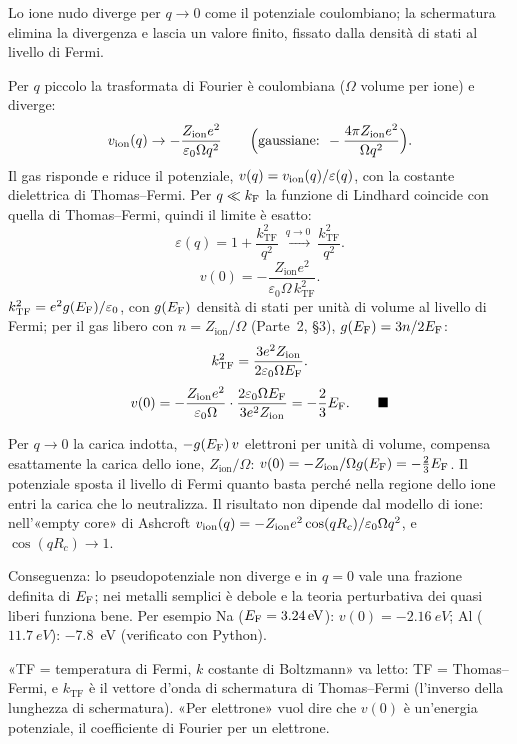 \documentclass[11pt,a4paper]{article}
\begin{document}
Lo ione nudo diverge per $q\to0$ come il potenziale coulombiano; la schermatura elimina la divergenza e lascia un valore finito, fissato dalla densità
di stati al livello di Fermi.
\begin{dimostrazione}[$v(0)=-\frac23\EF$]
Per $q$ piccolo la trasformata di Fourier è coulombiana ($\Omega$ volume per ione) e diverge:
\[
v_{\mathrm{ion}}(q)\to-\frac{Z_{\mathrm{ion}}e^2}{\varepsilon_0\Omega q^2}\qquad\Bigl(\text{gaussiane: }-\frac{4\pi Z_{\mathrm{ion}}e^2}{\Omega q^2}\Bigr).
\]
Il gas risponde e riduce il potenziale, $v(q)=v_{\mathrm{ion}}(q)/\varepsilon(q)$, con la costante dielettrica di Thomas--Fermi. Per $q\ll k_{\mathrm F}$ la funzione di
Lindhard coincide con quella di Thomas--Fermi, quindi il limite è esatto:
\[
\varepsilon(q)=1+\frac{k_{\mathrm{TF}}^2}{q^2}\ \xrightarrow{q\to0}\ \frac{k_{\mathrm{TF}}^2}{q^2}.
\]
\[
v(0)=-\frac{Z_{\mathrm{ion}}e^2}{\varepsilon_0\Omega\,k_{\mathrm{TF}}^2}.
\]
$k_{\mathrm{TF}}^2=e^2g(E_{\mathrm F})/\varepsilon_0$, con $g(E_{\mathrm F})$ densità di stati per unità di volume al livello di Fermi; per il gas libero con
$n=Z_{\mathrm{ion}}/\Omega$ (Parte~2, §3), $g(E_{\mathrm F})=3n/2E_{\mathrm F}$:
\[
k_{\mathrm{TF}}^2=\frac{3e^2Z_{\mathrm{ion}}}{2\varepsilon_0\Omega E_{\mathrm F}}.
\]
\[
v(0)=-\frac{Z_{\mathrm{ion}}e^2}{\varepsilon_0\Omega}\cdot\frac{2\varepsilon_0\Omega\EF}{3e^2Z_{\mathrm{ion}}}=-\frac23\EF .\qed
\]
\end{dimostrazione}
\begin{interpretazione}
Per $q\to0$ la carica indotta, $-g(E_{\mathrm F})\,v$ elettroni per unità di volume, compensa esattamente la carica dello ione, $Z_{\mathrm{ion}}/\Omega$:
$v(0)=-Z_{\mathrm{ion}}/\Omega g(E_{\mathrm F})=-\frac23E_{\mathrm F}$. Il potenziale sposta il livello di Fermi quanto basta perché nella regione dello ione entri la
carica che lo neutralizza. Il risultato non dipende dal modello di ione: nell'«empty core» di Ashcroft $v_{\mathrm{ion}}(q)=-Z_{\mathrm{ion}}e^2\cos(qR_c)/
\varepsilon_0\Omega q^2$, e $\cos(qR_c)\to1$.
\end{interpretazione}
Conseguenza: lo pseudopotenziale non diverge e in $q=0$ vale una frazione definita di $E_{\mathrm F}$; nei metalli semplici è debole e la teoria perturbativa dei
quasi liberi funziona bene. Per esempio Na ($E_{\mathrm F}=\SI{3.24}{eV}$): $v(0)=\SI{-2.16}{eV}$; Al ($\SI{11.7}{eV}$): \SI{-7.8}{eV} (verificato con Python).
\begin{osservazione}[slide 25]
«TF = temperatura di Fermi, $k$ costante di Boltzmann» va letto: TF = Thomas--Fermi, e $k_{\mathrm{TF}}$ è il vettore d'onda di schermatura di
Thomas--Fermi (l'inverso della lunghezza di schermatura). «Per elettrone» vuol dire che $v(0)$ è un'energia potenziale, il coefficiente di Fourier
per un elettrone.
\end{osservazione}
\end{document}
